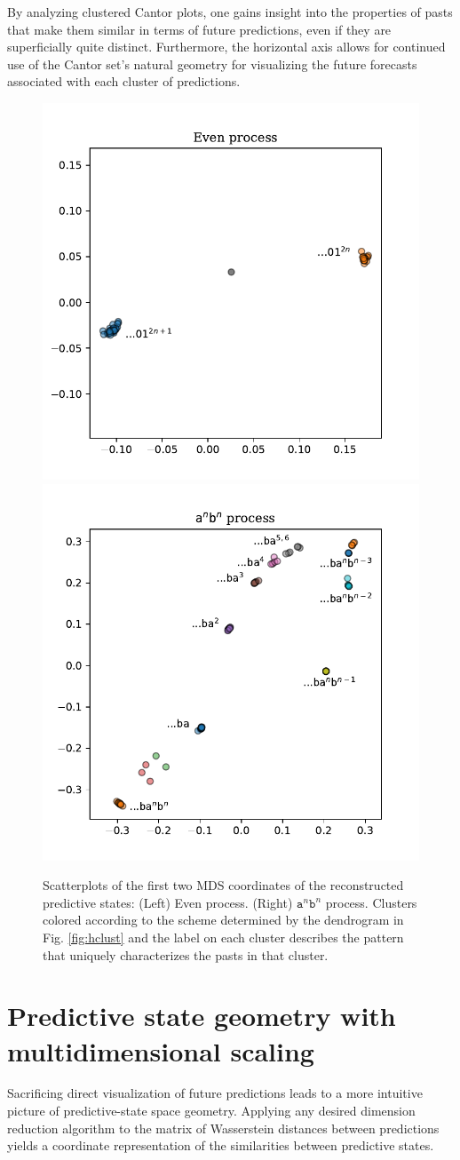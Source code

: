 \documentclass[draft,aps,pre,twocolumn,groupaddress,showkeys,nofootinbib,preprintnumbers,floatfix]{revtex4-2}
\begin{document}
By analyzing clustered Cantor plots, one gains insight into the properties of
pasts that make them similar in terms of future predictions, even if they are
superficially quite distinct. Furthermore, the horizontal axis allows for
continued use of the Cantor set's natural geometry for visualizing the future
forecasts associated with each cluster of predictions.

\begin{figure}[ht]
\centering
\includegraphics[width=0.45\linewidth]{../plots/even_MDS.pdf}
\includegraphics[width=0.45\linewidth]{../plots/anbn_MDS.pdf}
\caption{Scatterplots of the first two MDS coordinates of the reconstructed
	predictive states: (Left) Even process. (Right) $\mathtt{a}^n\mathtt{b}^n$
	process. Clusters colored according to the scheme determined by the
	dendrogram in Fig. \ref{fig:hclust} and the label on each cluster describes
	the pattern that uniquely characterizes the pasts in that cluster.
	}
\label{fig:mds}
\end{figure}

\section{Predictive state geometry with multidimensional scaling}

Sacrificing direct visualization of future predictions leads to a more
intuitive picture of predictive-state space geometry. Applying any desired
dimension reduction algorithm to the matrix of Wasserstein distances between
predictions yields a coordinate representation of the similarities between
predictive states.
\end{document}
